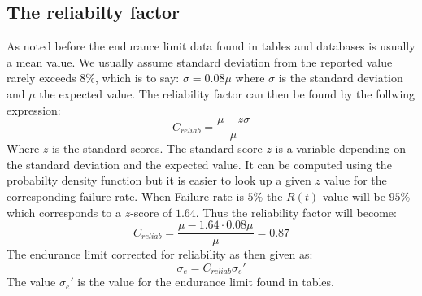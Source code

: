 \documentclass[11pt, a4paper]{article}
\begin{document}
\subsection{The reliabilty factor}
As noted before the endurance limit data found in tables and databases is usually a mean value. We usually assume standard deviation from the reported value rarely exceeds $8\%$, which is to say: $\sigma = 0.08\mu$ where $\sigma$ is the standard deviation and $\mu$ the expected value. The reliability factor can then be found by the follwing expression:
\begin{equation}
  C_{reliab} = \frac{\mu - z\sigma}{\mu}
\end{equation}
Where $z$ is the standard scores. The standard score $z$ is a variable depending on the standard deviation and the expected value. It can be computed using the probabilty density function but it is easier to look up a given $z$ value for the corresponding failure rate. When Failure rate is $5\%$ the $R(t)$ value will be $95\%$ which corresponds to a $z$-score of $1.64$. Thus the reliability factor will become:
\begin{equation}
  C_{reliab} = \frac{\mu - 1.64\cdot 0.08\mu}{\mu} = 0.87
\end{equation}
The endurance limit corrected for reliability as then given as:
\begin{equation}
  \sigma_e = C_{reliab}\sigma_e'
\end{equation}
The value $\sigma_e'$ is the value for the endurance limit found in tables.
\end{document}

